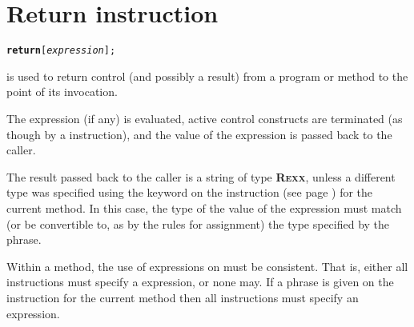 \chapter{Return instruction}\label{refreturn}
\begin{shaded}
\begin{alltt}
\textbf{return} [\emph{expression}];
\end{alltt}
\end{shaded}
  is used to return control (and possibly a result)
from a \nr{} program or method to the point of its invocation.
 
The expression (if any) is evaluated, active control constructs are
terminated (as though by a  instruction), and the value of
the expression is passed back to the caller.
 
The result passed back to the caller is a string of type \textbf{R\textsc{exx}},
unless a different type was specified using the  keyword
on the   instruction (see page \pageref{refmethod})  for the current
method.
In this case, the type of the value of the expression must match (or be
convertible to, as by the rules for assignment) the type specified by
the  phrase.
 
Within a method, the use of expressions on  must be
consistent.  That is, either all  instructions must
specify a expression, or none may.
If a  phrase is given on the  instruction
for the current method then all  instructions must
specify an expression.
